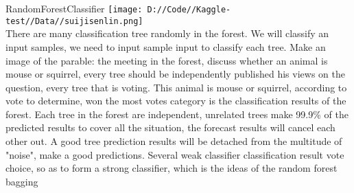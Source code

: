 \documentclass{tikzposter} %
\begin{document}
\begin{columns}
{\begin{description}
\item 
RandomForestClassifier
\texttt{[image: D://Code//Kaggle-test//Data//suijisenlin.png]}\\
There are many classification tree randomly in the forest. We will classify an input samples, we need to input sample input to classify each tree. Make an image of the parable: the meeting in the forest, discuss whether an animal is mouse or squirrel, every tree should be independently published his views on the question, every tree that is voting. This animal is mouse or squirrel, according to vote to determine, won the most votes category is the classification results of the forest. Each tree in the forest are independent, unrelated trees make 99.9\%  of the predicted results to cover all the situation, the forecast results will cancel each other out. A good tree prediction results will be detached from the multitude of "noise", make a good predictions. Several weak classifier classification result vote choice, so as to form a strong classifier, which is the ideas of the random forest bagging
  
\end{description}
  
  	
		


}
\end{columns}
\end{document}
